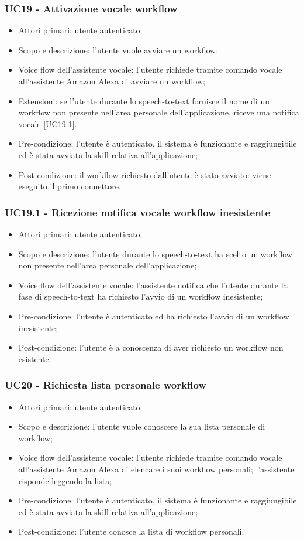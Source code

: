 \subsubsection{UC19 - Attivazione vocale workflow}
\begin{itemize}
	\item Attori primari: utente autenticato;
	\item Scopo e descrizione: l'utente vuole avviare un workflow;
	\item Voice flow dell'assistente vocale: l'utente richiede tramite comando vocale all'assistente Amazon Alexa di avviare un workflow;
	\item Estensioni:
		se l'utente durante lo speech-to-text fornisce il nome di un workflow non presente nell'area personale dell'applicazione, riceve una notifica vocale [UC19.1].
	\item Pre-condizione: l'utente è autenticato, il sistema è funzionante e raggiungibile ed è stata avviata la skill relativa all'applicazione;
	\item Post-condizione: il workflow richiesto dall'utente è stato avviato: viene eseguito il primo connettore.
\end{itemize}
\subsubsection{UC19.1 - Ricezione notifica vocale workflow inesistente}
\begin{itemize}
	\item Attori primari: utente autenticato;
	\item Scopo e descrizione: l'utente durante lo speech-to-text ha scelto un workflow non presente nell'area personale dell'applicazione;
	\item Voice flow dell'assistente vocale: l'assistente notifica che l'utente durante la fase di speech-to-text ha richiesto l'avvio di un workflow inesistente;
	\item Pre-condizione: l'utente è autenticato ed ha richiesto l'avvio di un workflow inesistente;
	\item Post-condizione: l'utente è a conoscenza di aver richiesto un workflow non esistente.
\end{itemize}
\subsubsection{UC20 - Richiesta lista personale workflow}
\begin{itemize}
	\item Attori primari: utente autenticato;
	\item Scopo e descrizione: l'utente vuole conoscere la sua lista personale di workflow;
	\item Voice flow dell'assistente vocale: l'utente richiede tramite comando vocale all'assistente Amazon Alexa di elencare i suoi workflow personali; l'assistente risponde leggendo la lista;
	\item Pre-condizione: l'utente è autenticato, il sistema è funzionante e raggiungibile ed è stata avviata la skill relativa all'applicazione;
	\item Post-condizione: l'utente conosce la lista di workflow personali.
\end{itemize}
